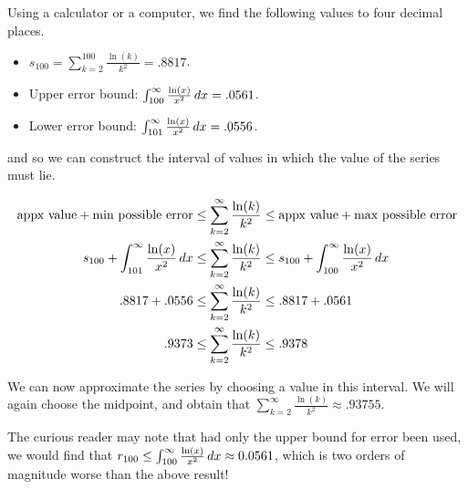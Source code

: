 \documentclass{ximera}
\begin{document}
\begin{example}
\begin{explanation}
%
%
%
%
%
%
%
Using a calculator or a computer, we find the following values to four decimal places.

\begin{itemize}
\item $s_{100} = \sum_{k=2}^{100} \frac{\ln(k)}{k^2} = .8817$.
\item Upper error bound: $\int_{100}^\infty \frac{\ln(x)}{x^2} \,d x = .0561$.
\item Lower error bound: $\int_{101}^\infty \frac{\ln(x)}{x^2} \,d x = .0556$.
\end{itemize}

and so we can construct the interval of values in which the value of the series must lie.

\begin{align*}
\textrm{appx value} + \textrm{min possible error} & \leq   \sum_{k=2}^{\infty} \frac{\ln(k)}{k^2} \leq  \textrm{appx value} + \textrm{max possible error} \\
s_{100} + \int_{101}^\infty \frac{\ln(x)}{x^2} \,d x & \leq   \sum_{k=2}^{\infty} \frac{\ln(k)}{k^2} \leq s_{100} + \int_{100}^\infty \frac{\ln(x)}{x^2} \,d x \\
.8817 + .0556 & \leq  \sum_{k=2}^{\infty} \frac{\ln(k)}{k^2} \leq .8817 + .0561 \\
.9373 & \leq  \sum_{k=2}^{\infty} \frac{\ln(k)}{k^2} \leq .9378
\end{align*}

We can now approximate the series by choosing a value in this interval.  We will again choose the midpoint, and obtain that $\sum_{k=2}^{\infty} \frac{\ln(k)}{k^2} \approx .93755$.


\begin{remark}
The curious reader may note that had only the upper bound for error been used, we would find that $r_{100} \leq \int_{100}^{\infty} \frac{\ln(x)}{x^2} \,d x \approx 0.0561$, which is two orders of magnitude worse than the above result!
\end{remark}



\end{explanation}
\end{example}
\end{document}
